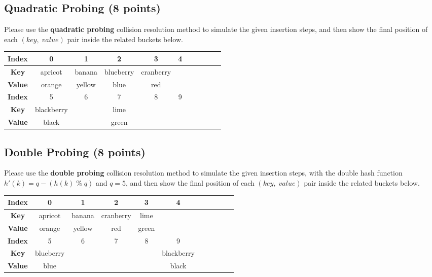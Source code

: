 \documentclass[11pt]{exam}
\begin{document}
\subsection{Quadratic Probing (8 points)}
Please use the \textbf{quadratic probing} collision resolution method to simulate the given insertion steps, and then show the final position of each $(key,\;value)$ pair inside the related buckets below.
\begin{solution}
\begin{table}[H]
\centering
\renewcommand{\arraystretch}{2}
\setlength{\tabcolsep}{5mm}
\begin{tabular}{|c|c|c|c|c|c|c|c|c|c|c|}
\hline
\textbf{Index}&0&1&2&3&4\\
\hline
\textbf{Key}&apricot&banana&blueberry&cranberry&\qquad \qquad \qquad\\
\hline
\textbf{Value}&orange&yellow&blue&red&\\
\hline
\textbf{Index}&5&6&7&8&9\\
\hline
\textbf{Key}&blackberry&&lime&&\\
\hline
\textbf{Value}&black&&green&&\\
\hline
\end{tabular}
\end{table}
\end{solution}

\subsection{Double Probing (8 points)}
Please use the \textbf{double probing} collision resolution method to simulate the given insertion steps, with the double hash function $h'(k) = q - (h(k) \;\%\; q)$ and $q=5$, and then show the final position of each $(key,\;value)$ pair inside the related buckets below.
\begin{solution}
\begin{table}[H]
\centering
\renewcommand{\arraystretch}{2}
\setlength{\tabcolsep}{5mm}
\begin{tabular}{|c|c|c|c|c|c|c|c|c|c|c|}
\hline
\textbf{Index}&0&1&2&3&4\\
\hline
\textbf{Key}&apricot&banana&cranberry&lime&\\
\hline
\textbf{Value}&orange&yellow&red&green&\\
\hline
\textbf{Index}&5&6&7&8&9\\
\hline
\textbf{Key}&blueberry&&&&blackberry\\
\hline
\textbf{Value}&blue&&&&black\\
\hline
\end{tabular}
\end{table}
\end{solution}
\end{document}

